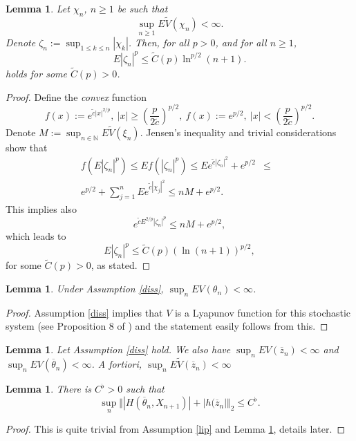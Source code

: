 \documentclass[a4paper,draft]{article}
\newtheorem{lemma}[theorem]{Lemma}
\begin{document}
\begin{lemma}\label{toranaga} Let $\chi_n$, $n\geq 1$ be such that
$$
\sup_{n\geq 1} E\tilde{V}(\chi_n)<\infty.$$
Denote $\zeta_n:=\sup_{1\leq k\leq n}|\chi_k|$.
Then, for all $p>0$, and for all $n\geq 1$,
$$
E|\zeta_n|^p\leq \tilde{C}(p)\ln^{p/2}(n+1).
$$
holds for some $\tilde{C}(p)>0$.
\end{lemma}
\begin{proof} Define the \emph{convex} function
$$
f(x):=e^{\tilde{c}|x|^{2/p}},\ |x|\geq \left(\frac{p}{2\tilde{c}}\right)^{p/2},\ f(x):=e^{p/2},\ |x|<\left(\frac{p}{2\tilde{c}}\right)^{p/2}.
$$
Denote $M:=\sup_{n\in\mathbb{N}}E\tilde{V}(\xi_n)$.
Jensen's inequality and trivial considerations show that
\begin{eqnarray*}
f(E|\zeta_n|^p)\leq Ef(|\zeta_n|^p)\leq Ee^{\tilde{c}|\zeta_n|^2}+
e^{p/2} &\leq&\\
e^{p/2}+\sum_{j=1}^n Ee^{\tilde{c}|\chi_j|^2} \leq nM +e^{p/2}.
\end{eqnarray*}
This implies also
$$
e^{\tilde{c}E^{2/p}|\zeta_n|^p}\leq nM +e^{p/2},
$$
which leads to
$$
E|\zeta_n|^p\leq \tilde{C}(p)(\ln(n+1))^{p/2},
$$
for some $\tilde{C}(p)>0$, as stated.
\end{proof}

\begin{lemma} Under Assumption \ref{diss},
$\sup_{n} EV(\theta_n)<\infty$.
\end{lemma}
\begin{proof}
Assumption \ref{diss} implies that $V$ is a Lyapunov function for
this stochastic system (see Proposition 8 of \cite{unadjusted}) and the statement easily follows from this.
\end{proof}

\begin{lemma}\label{lavel} Let Assumption \ref{diss} hold.
We also have $\sup_n EV(\overline{z}_n)<\infty$ and $\sup_n EV(\overline{\theta}_n)<\infty$. {A fortiori},
$\sup_n E\tilde{V}(\overline{z}_n)<\infty$
\end{lemma}

\begin{lemma}\label{easy}
There is $C^{\flat}>0$ such that
$$
\sup_{n}\Vert |H(\overline{\theta}_n,X_{n+1})|+|h(\overline{z}_n|\Vert_2\leq C^{\flat}.
$$
\end{lemma}
\begin{proof}
This is quite trivial from Assumption \ref{lip} and Lemma \ref{lavel}, details later.
\end{proof}
\end{document}
